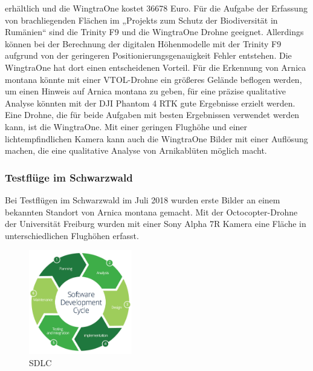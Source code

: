 erhältlich und die WingtraOne kostet 36678 Euro. %
Für die Aufgabe der Erfassung von brachliegenden Flächen im „Projekts zum Schutz der Biodiversität in Rumänien“ sind die Trinity F9 und die WingtraOne Drohne geeignet. Allerdings können bei der Berechnung der digitalen Höhenmodelle mit der Trinity F9 aufgrund von der geringeren Positionierungsgenauigkeit Fehler entstehen. Die WingtraOne hat dort einen entscheidenen Vorteil. Für die Erkennung von Arnica montana könnte mit einer VTOL-Drohne ein größeres Gelände beflogen werden, um einen Hinweis auf Arnica montana zu geben, für eine präzise qualitative Analyse könnten mit der DJI Phantom 4 RTK gute Ergebnisse erzielt werden. Eine Drohne, die für beide Aufgaben mit besten Ergebnissen verwendet werden kann, ist die WingtraOne. Mit einer geringen Flughöhe und einer lichtempfindlichen Kamera kann auch die WingtraOne Bilder mit einer Auflösung machen, die eine qualitative Analyse von Arnikablüten möglich macht. 

\subsubsection{Testflüge im Schwarzwald}

Bei Testflügen im Schwarzwald im Juli 2018 wurden erste Bilder an einem bekannten Standort von Arnica montana gemacht. Mit der Octocopter-Drohne der Universität Freiburg wurden mit einer Sony Alpha 7R Kamera eine Fläche in unterschiedlichen Flughöhen erfasst. 
\begin{figure}
  \vspace{-30pt}
  \begin{center}
    \includegraphics[width=0.4\textwidth]{abb/SDLC}
  \end{center}
  \vspace{-20pt}
  \caption[System Developement Life Circle \citep{Smartsheet2019}]{\footnotesize SDLC \citep{Smartsheet2019}}
  \label{fig:sdlc}
  \vspace{-30pt}
\end{figure}

